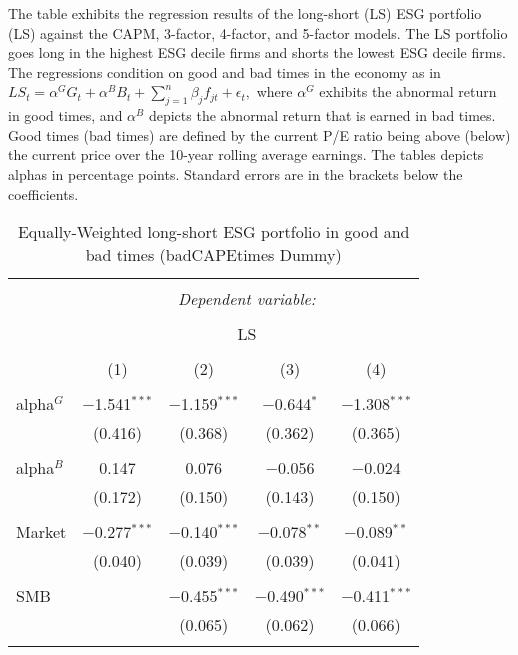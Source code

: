 \documentclass[11pt]{article}
\newcommand\fnote[1]{\captionsetup{font=small}\caption*{#1}}
\begin{document}
\begin{table}[!htbp] \centering 
	\caption{Equally-Weighted long-short ESG portfolio in good and bad times (badCAPEtimes Dummy)} 
	\fnote{The table exhibits the regression results of the long-short (LS) ESG portfolio (LS) against the CAPM, 3-factor, 4-factor, and 5-factor models. The LS portfolio goes long in the highest ESG decile firms and shorts the lowest ESG decile firms. The regressions condition on good and bad times in the economy as in $LS_{t} = \alpha^G G_t + \alpha^B B_t + \sum_{j=1}^{n} \beta_{j} f_{jt} + \epsilon_{t},$ where $\alpha^G$ exhibits the abnormal return in good times, and $\alpha^B$ depicts the abnormal return that is earned in bad times. Good times (bad times) are defined by the current P/E ratio being above (below) the current price over the 10-year rolling average earnings. The tables depicts alphas in percentage points. Standard errors are in the brackets below the coefficients.}
	\label{tab:goodandbadfactor} 
	\begin{tabular*}{\textwidth}{l @{\extracolsep{\fill}} cccc}
		\\[-1.8ex]\hline 
		\hline \\[-1.8ex] 
		& \multicolumn{4}{c}{\textit{Dependent variable:}} \\ 
		\cline{2-5} 
		\\[-1.8ex] & \multicolumn{4}{c}{LS} \\ 
		\\[-1.8ex] & (1) & (2) & (3) & (4)\\ 
		\hline \\[-1.8ex] 
		alpha$^G$ & $-$1.541$^{***}$ & $-$1.159$^{***}$ & $-$0.644$^{*}$ & $-$1.308$^{***}$ \\ 
		& (0.416) & (0.368) & (0.362) & (0.365) \\ 
		& & & & \\ 
		alpha$^B$ & 0.147 & 0.076 & $-$0.056 & $-$0.024 \\ 
		& (0.172) & (0.150) & (0.143) & (0.150) \\ 
		& & & & \\ 
		Market & $-$0.277$^{***}$ & $-$0.140$^{***}$ & $-$0.078$^{**}$ & $-$0.089$^{**}$ \\ 
		& (0.040) & (0.039) & (0.039) & (0.041) \\ 
		& & & & \\ 
		SMB &  & $-$0.455$^{***}$ & $-$0.490$^{***}$ & $-$0.411$^{***}$ \\ 
		&  & (0.065) & (0.062) & (0.066) \\ 
		& & & & \\ 

\end{tabular*}
\end{table}
\end{document}
